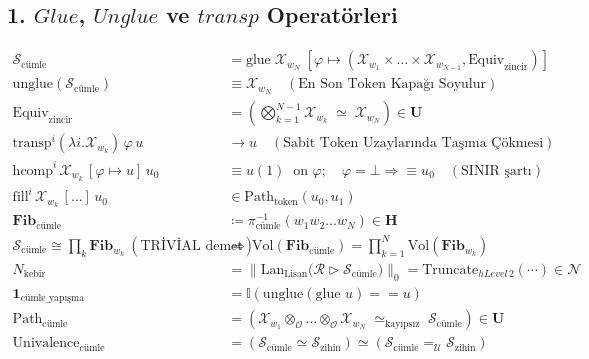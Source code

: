 \documentclass[11pt, a4paper]{article}
\begin{document}
\subsection{1. $Glue$, $Unglue$ ve $transp$ Operatörleri}
\begin{align}
\mathcal{S}_{\text{cümle}} &= \text{glue} \; \mathcal{X}_{w_N} \; \left[ \varphi \mapsto (\mathcal{X}_{w_1} \times \dots \times \mathcal{X}_{w_{N-1}}, \text{Equiv}_{\text{zincir}}) \right] \\
\text{unglue}(\mathcal{S}_{\text{cümle}}) &\equiv \mathcal{X}_{w_N} \quad (\text{En Son Token Kapağı Soyulur}) \\
\text{Equiv}_{\text{zincir}} &= \left( \bigotimes_{k=1}^{N-1} \mathcal{X}_{w_k} \;\simeq\; \mathcal{X}_{w_N} \right) \in \mathbf{U} \\
\text{transp}^i (\lambda i. \mathcal{X}_{w_k}) \, \varphi \, u &\longrightarrow u \quad (\text{Sabit Token Uzaylarında Taşıma Çökmesi}) \\
\text{hcomp}^i \, \mathcal{X}_{w_k} \, [\varphi \mapsto u] \, u_0 &\equiv u(1) \ \text{ on } \varphi; \quad \varphi = \bot \Rightarrow \equiv u_0 \quad (\text{SINIR şartı}) \\
\text{fill}^i \, \mathcal{X}_{w_k} \, [\dots] \, u_0 &\in \text{Path}_{\text{token}}(u_0, u_1) \\
\mathbf{Fib}_{\text{cümle}} &\coloneqq \pi_{\text{cümle}}^{-1}(w_1 w_2 \dots w_N) \in \mathbf{H} \\
\mathcal{S}_{\text{cümle}} \cong \textstyle\prod_k \mathbf{Fib}_{w_k} \ (\text{TRİVİAL demet}) \ &\Rightarrow \ \text{Vol}(\mathbf{Fib}_{\text{cümle}}) = \prod_{k=1}^N \text{Vol}(\mathbf{Fib}_{w_k}) \\
N_{\text{kebîr}} &= \big\| \text{Lan}_{\text{Lisan}} \big( \mathcal{R} \triangleright \mathcal{S}_{\text{cümle}} \big) \big\|_0 = \text{Truncate}_{hLevel\,2}(\cdots) \in \mathcal{N} \\
\mathbf{1}_{\text{cümle\_yapışma}} &= \mathbb{I}\left( \text{unglue}(\text{glue } u) == u \right) \\
\text{Path}_{\text{cümle}} &= \left( \mathcal{X}_{w_1} \otimes_{\mathcal{O}} \dots \otimes_{\mathcal{O}} \mathcal{X}_{w_N} \;\simeq_{\text{kayıpsız}}\; \mathcal{S}_{\text{cümle}} \right) \in \mathbf{U} \\
\text{Univalence}_{\text{cümle}} &= (\mathcal{S}_{\text{cümle}} \simeq \mathcal{S}_{\text{zihin}}) \simeq (\mathcal{S}_{\text{cümle}} =_{\mathcal{U}} \mathcal{S}_{\text{zihin}})
\end{align}
\end{document}
